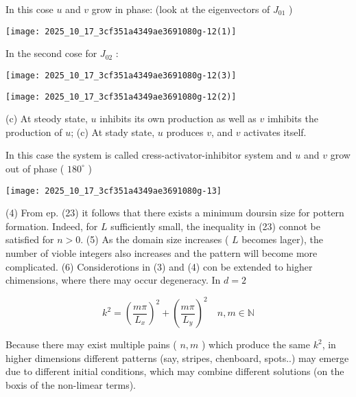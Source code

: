 In this cose $u$ and $v$ grow in phase: (look at the eigenvectors of $J_{01}$ )
\begin{center}
\texttt{[image: 2025\_10\_17\_3cf351a4349ae3691080g-12(1)]}
\end{center}

In the second cose for $J_{02}$ :
\begin{center}
\texttt{[image: 2025\_10\_17\_3cf351a4349ae3691080g-12(3)]}
\end{center}
\begin{center}
\texttt{[image: 2025\_10\_17\_3cf351a4349ae3691080g-12(2)]}
\end{center}
(c) At steody state, $u$ inhibits its own production as well as $v$ imhibits the production of $u$;
(c) At stady state, $u$ produces $v$, and $v$ activates itself.

In this case the system is called cress-activator-inhibitor system and $u$ and $v$ grow out of phase ( $180^{\circ}$ )
\begin{center}
\texttt{[image: 2025\_10\_17\_3cf351a4349ae3691080g-13]}
\end{center}
(4) From ep. (23) it follows that there exists a minimum doursin size for pottern formation. Indeed, for $L$ sufficiently small, the inequality in (23) connot be satisfied for $n>0$.
(5) As the domain size increases ( $L$ becomes lager), the number of vioble integers also increases and the pattern will become more complicated.
(6) Considerotions in (3) and (4) con be extended to higher chimensions, where there may occur degeneracy. In $d=2$

$$ 
k^{2}=\left(\frac{m \pi}{L_{x}}\right)^{2}+\left(\frac{m \pi}{L_{y}}\right)^{2} \quad n, m \in \mathbb{N}
$$ 

Because there may exist multiple pains ( $n, m$ ) which produce the same $k^{2}$, in higher dimensions different patterns (say, stripes, chenboard, spots..) may emerge due to different initial conditions, which may combine different solutions (on the boxis of the non-limear terms).